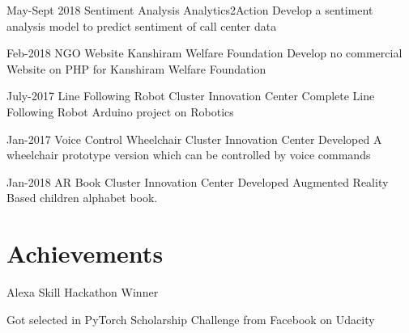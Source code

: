 \documentclass[]{cv-style}          %
\begin{document}
\begin{entrylist}
\entry
{May-Sept 2018}
{Sentiment Analysis }
{Analytics2Action}
{Develop a sentiment analysis model to predict sentiment of call center data }
{\vspace{-0.3cm}}
\end{entrylist}

\begin{entrylist}
\entry
{Feb-2018}
{NGO Website}
{Kanshiram Welfare Foundation}
{Develop no commercial Website on PHP for Kanshiram Welfare Foundation  }
{\vspace{-0.3cm}}
\end{entrylist}

\begin{entrylist}
\entry
{July-2017}
{Line Following Robot }
{Cluster Innovation Center}
{Complete Line Following Robot Arduino project on Robotics }
{\vspace{-0.3cm}}
\end{entrylist}
\begin{entrylist}
\entry
{Jan-2017}
{Voice Control Wheelchair}
{Cluster Innovation Center}
{Developed A wheelchair prototype version which can be controlled by voice commands}
{\vspace{-0.3cm}}


\end{entrylist}
\begin{entrylist}
\entry
{Jan-2018}
{AR Book}
{Cluster Innovation Center}
{Developed Augmented Reality Based children alphabet book. }
{\vspace{-0.3cm}}


\end{entrylist}

\section{Achievements}

\begin{entrylist}
\entry
{}
{Alexa Skill Hackathon Winner}
{}
{}

\end{entrylist}
\begin{entrylist}
\entry
{}
{ Got selected in PyTorch Scholarship Challenge from Facebook on Udacity }
{}
{}

\end{entrylist}
\end{document}

